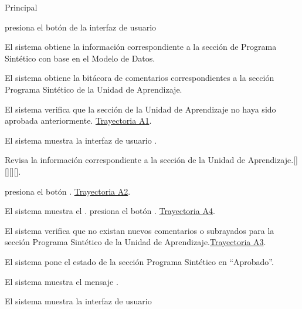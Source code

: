 \begin{UCtrayectoria}{Principal}

    \UCpaso[\UCactor] presiona el botón   de la interfaz de usuario 

    \UCpaso El sistema obtiene la información correspondiente a la sección de Programa Sintético con base en el Modelo de Datos.
    
    \UCpaso El sistema obtiene la bitácora de comentarios correspondientes a la sección Programa Sintético de la Unidad de Aprendizaje. 
    
    \UCpaso El sistema verifica que la sección de la Unidad de Aprendizaje no haya sido aprobada anteriormente.  \hyperlink{SP2-CU5-A1}{Trayectoria A1}. 
    
    \UCpaso El sistema muestra la interfaz de usuario  .
    
    \UCpaso[\UCactor] Revisa la información correspondiente a la sección de la Unidad de Aprendizaje.[][][][].
    
    \UCpaso[\UCactor] presiona el botón . \hyperlink{SP2-CU5-A2}{Trayectoria A2}.
    
    \UCpaso El sistema muestra el .
    \UCpaso [\UCactor] presiona el botón . \hyperlink{SP2-CU5-A4}{Trayectoria A4}.
    
    \UCpaso	El sistema verifica que no existan nuevos comentarios o subrayados para la sección Programa Sintético de la Unidad de Aprendizaje.\hyperlink{SP2-CU5-A3}{Trayectoria A3}. 
    
    \UCpaso El sistema pone el estado de la sección Programa Sintético en “Aprobado”.
    
    \UCpaso El sistema muestra el mensaje .

    \UCpaso El sistema muestra la interfaz de usuario 

\end{UCtrayectoria}


